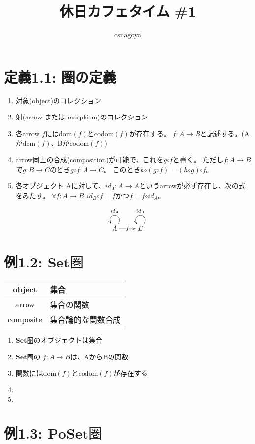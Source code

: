 \documentclass[a4j,9pt]{jsarticle}
\makeatletter
\newcommand{\dom}[1]{\ensuremath{\mathrm{dom}(#1)}}
\newcommand{\codom}[1]{\ensuremath{\mathrm{codom}(#1)}}
\newcommand{\comp}{\ensuremath{\mathrm{\circ}}}
\newcommand{\id}[1]{\ensuremath{\mathit{id}_{#1}}}
\newcommand{\Set}{\ensuremath{\mathbf{Set}圏}}
\newcommand{\PoSet}{\ensuremath{\mathbf{PoSet}圏}}
\newcommand{\aID}[1]{\ar@(ur,ul)_{id_{#1}}}
\makeatother
\begin{document}
\title{休日カフェタイム \#1}
\author{csnagoya}
\maketitle
\section{定義1.1: 圏の定義}
\begin{enumerate}
\item 対象(object)のコレクション
\item 射(arrow または morphism)のコレクション
\item 各arrow $f$には\dom{f}と\codom{f}が存在する。
  $f : A \to B$と記述する。(Aが\dom{f}、Bが\codom{f})
\item arrow同士の合成(composition)が可能で、これを$g \comp f$と書く。
  ただし$f : A \to B$で$g : B \to C$のとき$g \comp f : A \to C$。
  このとき$h \comp ( g \comp f) = (h \comp g) \comp f$。
\item 各オブジェクト Aに対して、$\id{A} : A \to A$というarrowが必ず存在し、次の式をみたす。
  $\forall f : A \to B, \id{B} \comp f = f$かつ$f = f \comp \id{A}$。
\end{enumerate}

\[
\xymatrix{
  A \aID{A} \ar[r]|f & B \aID{B}
}
\]

\section{例1.2: \Set}\label{set}

\begin{tabular}{|c|l|}
\hline
object & 集合 \\\hline
arrow  & 集合の関数 \\\hline
composite & 集合論的な関数合成 \\\hline
\end{tabular}

\begin{enumerate}
\item \Set のオブジェクトは集合
\item \Set の $f : A \to B$は、AからBの関数
\item 関数には\dom{f}と\codom{f}が存在する
\item
\item
\end{enumerate}

\section{例1.3: \PoSet}
\end{document}
